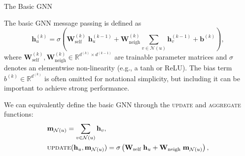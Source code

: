 \documentclass[10pt, aspectratio=169, compress, protectframetitle, handout]{beamer}
\begin{document}
\begin{frame}{The Basic GNN}

    The basic GNN message passing is defined as
    \begin{equation}
        \mathbf h^{(k)}_u = \sigma \left( \mathbf W^{(k)}_\text{self} \; \mathbf h_u^{(k-1)} + \mathbf W_\text{neigh}^{(k)} \sum_{v \in \mathcal N(u)} \mathbf h^{(k-1)}_v + \mathbf b^{(k)} \right),
    \end{equation}
    where $\mathbf W^{(k)}_\text{self}, \mathbf W_\text{neigh}^{(k)} \in \mathbb R^{d^{(k)} \times d^{(k-1)}}$ are \alert{trainable parameter matrices} and $\sigma$ denotes an \alert{elementwise non-linearity} (e.g., a tanh or ReLU). The \alert{bias term} $b^{(k)} \in \mathbb R^{d^{(k)}}$ is often omitted for notational simplicity, but including it can be important to achieve strong performance.
    
    We can equivalently define the basic GNN through the \textsc{update} and \textsc{aggregate} functions:
    \begin{align}
        &\mathbf m_{\mathcal N(u)} = \sum_{v \in \mathcal N(u)} \mathbf h_v, 
        \label{eq:basicgnn} \\
        &\textsc{update}(\mathbf h_u, \mathbf m_{\mathcal N(u)}) = \sigma \left( \mathbf W_\text{self} \; \mathbf h_u + \mathbf W_\text{neigh} \; \mathbf m_{\mathcal N(u)} \right),
    \end{align}
    
\end{frame}
\end{document}
